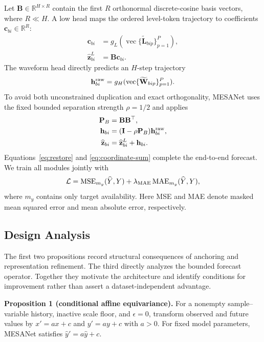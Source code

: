 Let $\mathbf B\in\mathbb R^{H\times R}$ contain the first $R$ orthonormal
discrete-cosine basis vectors, where $R\ll H$. A low head maps the ordered
level-token trajectory to coefficients $\mathbf c_{bi}\in\mathbb R^R$:
\begin{align}
\mathbf c_{bi} &= g_L(\operatorname{vec}\{\widetilde{\mathbf L}_{bip}\}_{p=1}^{P}),
\label{eq:low-coeff}\\
\widehat{\mathbf z}^{L}_{bi} &= \mathbf B\mathbf c_{bi}.
\label{eq:low-forecast}
\end{align}
The waveform head directly predicts an $H$-step trajectory
\begin{equation}
\mathbf h^{\rm raw}_{bi}=g_H(
\operatorname{vec}\{\widetilde{\mathbf W}_{bip}\}_{p=1}^{P}).
\label{eq:raw-high}
\end{equation}
To avoid both unconstrained duplication and exact orthogonality, MESANet uses
the fixed bounded separation strength $\rho=1/2$ and applies
\begin{align}
\mathbf P_B &= \mathbf B\mathbf B^\top, \label{eq:projector}\\
\mathbf h_{bi} &= (\mathbf I-\rho\mathbf P_B)\mathbf h^{\rm raw}_{bi},
\label{eq:soft-separation}\\
\widehat{\mathbf z}_{bi} &= \widehat{\mathbf z}^{L}_{bi}+\mathbf h_{bi}.
\label{eq:coordinate-sum}
\end{align}
Equations~\eqref{eq:restore} and \eqref{eq:coordinate-sum} complete the
end-to-end forecast. We train all modules jointly with
\begin{equation}
\mathcal L=\operatorname{MSE}_{m_y}(\widehat Y,Y)
+\lambda_{\rm MAE}\operatorname{MAE}_{m_y}(\widehat Y,Y),
\label{eq:loss}
\end{equation}
where $m_y$ contains only target availability. Here MSE and MAE denote masked
mean squared error and mean absolute error, respectively.

\subsection{Design Analysis}

The first two propositions record structural consequences of anchoring and
representation refinement. The third directly analyzes the bounded forecast
operator. Together they motivate the architecture and identify conditions for
improvement rather than assert a dataset-independent advantage.

\textbf{Proposition 1 (conditional affine equivariance).}
For a nonempty sample--variable history, inactive scale floor, and
$\epsilon=0$, transform observed and future values by $x'=ax+c$ and $y'=ay+c$
with $a>0$. For fixed model parameters, MESANet satisfies
$\widehat y'=a\widehat y+c$.

